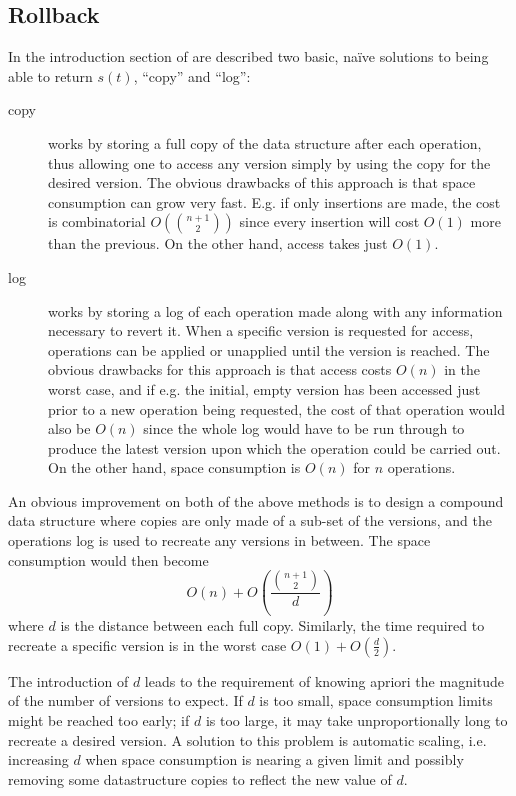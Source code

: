 \subsection{Rollback}

In the introduction section of \cite{Tsotras1995237} are described two basic,
na\"ive solutions to being able to return $s(t)$, ``copy'' and ``log'':
\begin{description}
  \item[copy] works by storing a full copy of the data structure after each
  operation, thus allowing one to access any version simply by using the copy
  for the desired version. The obvious drawbacks of this approach is that space
  consumption can grow very fast. E.g. if only insertions are made, the cost is
  combinatorial $O\left(\binom{n+1}{2}\right)$ since every insertion will cost
  $O(1)$ more than the previous. On the other hand, access takes just $O(1)$.
  \item[log] works by storing a log of each operation made along with any
  information necessary to revert it. When a specific version is requested for
  access, operations can be applied or unapplied until the version is reached. 
  The obvious drawbacks for this approach is that access costs $O(n)$ in the 
  worst case, and if e.g. the initial, empty version has been accessed just 
  prior to a new operation being requested, the cost of that operation would 
  also be $O(n)$ since the whole log would have to be run through to produce 
  the latest version upon which the operation could be carried out. On the other
  hand, space consumption is $O(n)$ for $n$ operations.
\end{description}

An obvious improvement on both of the above methods is to design a compound data
structure where copies are only made of a sub-set of the versions, and the
operations log is used to recreate any versions in between. The space
consumption would then become $$O(n)+O\left(\frac{\binom{n+1}{2}}{d}\right)$$
where $d$ is the distance between each full copy. Similarly, the time required
to recreate a specific version is in the worst case
$O(1)+O\left(\frac{d}{2}\right)$.

The introduction of $d$ leads to the requirement of knowing apriori the
magnitude of the number of versions to expect. If $d$ is too small, space
consumption limits might be reached too early; if $d$ is too large, it may take
unproportionally long to recreate a desired version. A solution to this problem
is automatic scaling, i.e. increasing $d$ when space consumption is nearing a
given limit and possibly removing some datastructure copies to reflect the new
value of $d$.

